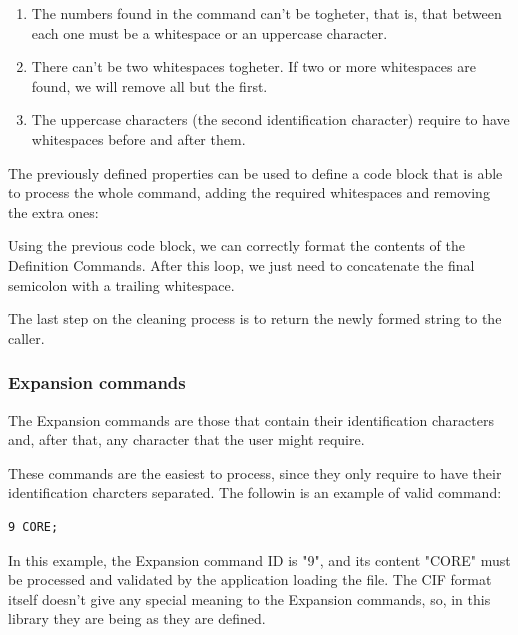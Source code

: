 \documentclass[11pt,twoside,openany,x11names,svgnames]{memoir}
\begin{document}
\begin{enumerate}
\item The numbers found in the command can't be togheter, that is, that between each one must be a whitespace or an uppercase character.
\item There can't be two whitespaces togheter. If two or more whitespaces are found, we will remove all but the first.
\item The uppercase characters (the second identification character) require to have whitespaces before and after them.
\end{enumerate}

The previously defined properties can be used to define a code block that is able to process the whole command, adding the required whitespaces and removing the extra ones:



Using the previous code block, we can correctly format the contents of the Definition Commands. After this loop, we just need to concatenate the final semicolon with a trailing whitespace.

The last step on the cleaning process is to return the newly formed string to the caller.

\subsubsection{Expansion commands}\label{Expansion-commands}

The Expansion commands are those that contain their identification characters and, after that, any character that the user might require.

These commands are the easiest to process, since they only require to have their identification charcters separated. The followin is an example of valid command:

\begin{verbatim}
9 CORE;
\end{verbatim}

In this example, the Expansion command ID is "9", and its content "CORE" must be processed and validated by the application loading the file. The CIF format itself doesn't give any special meaning to the Expansion commands, so, in this library they are being as they are defined.
\end{document}
